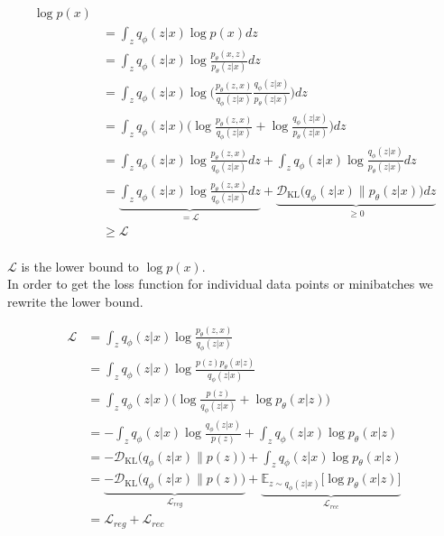 \begin{align*}
  \log p(x)\\
  &= \int_z q_\phi(z|x) \log p(x) dz\\
  &= \int_z q_\phi(z|x) \log \frac{p_\theta(x,z)}{p_\theta(z|x)} dz \tag{Bayes' rule}\\
  &= \int_z q_\phi(z|x) \log\bigg(\frac{p_\theta(z,x)}{q_\phi(z|x)} \frac{q_\phi(z|x)}{p_\theta(z|x)}\bigg) dz \tag{Chain rule}\\
  &= \int_z q_\phi(z|x) \bigg(\log\frac{p_\theta(z,x)}{q_\phi(z|x)} + \log\frac{q_\phi(z|x)}{p_\theta(z|x)}\bigg) dz\\
  &= \int_z q_\phi(z|x) \log \frac{p_\theta(z,x)}{q_\phi(z|x)} dz + \int_z q_\phi(z|x) \log\frac{q_\phi(z|x)}{p_\theta(z|x)} dz\\
  &= \underbrace{\int_z q_\phi(z|x) \log \frac{p_\theta(z,x)}{q_\phi(z|x)} dz}_{= \mathcal{L}}+ \underbrace{\mathcal{D}_{\mathrm{KL}}\big(q_\phi(z|x) \| p_\theta(z|x)\big) dz}_{\geq 0}\\
  &\geq \mathcal{L}\\
\end{align*}

$\mathcal{L}$ is the lower bound to $\log p(x)$.\\
In order to get the loss function for individual data points or minibatches we rewrite the lower bound.

\begin{align*}
  \mathcal{L}
  &= \int_z q_\phi(z|x) \log\frac{p_\theta(z,x)}{q_\phi(z|x)}\\
  &= \int_z q_\phi(z|x) \log\frac{p(z) p_\theta(x|z)}{q_\phi(z|x)} \tag{we assume that x is conditionally dependent on z}\\
  &= \int_z q_\phi(z|x) \bigg(\log\frac{p(z)}{q_\phi(z|x)} + \log p_\theta(x|z)\bigg)\\
  &= -\int_z q_\phi(z|x) \log\frac{q_\phi(z|x)}{p(z)} + \int_z q_\phi(z|x) \log p_\theta(x|z)\\
  &= -\mathcal{D}_{\mathrm{KL}}\big(q_\phi(z|x) \| p(z)\big) + \int_z q_\phi(z|x) \log p_\theta(x|z)\\
  &= \underbrace{-\mathcal{D}_{\mathrm{KL}}\big(q_\phi(z|x) \| p(z)\big)}_{\mathcal{L}_{reg}} + \underbrace{\mathbb{E}_{z \sim q_\phi(z|x)}\big[ \log p_\theta(x|z)\big]}_{\mathcal{L}_{rec}}\\
  &= \mathcal{L}_{reg} + \mathcal{L}_{rec}
\end{align*}
